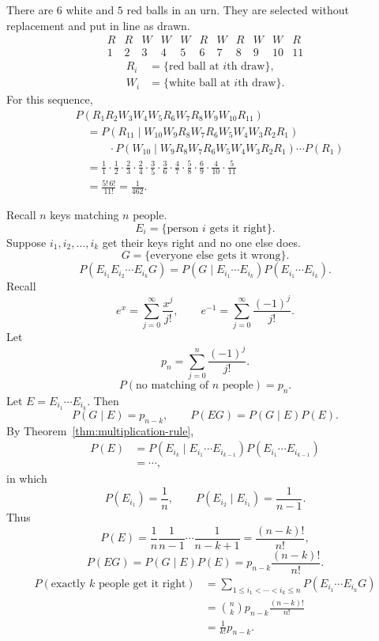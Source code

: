 \begin{example}
  There are $6$ white and $5$ red balls in an urn. They are selected without replacement and put in line as drawn.
  \[
    \begin{array}{ccccccccccc}
      R & R & W & W & W & R & W & R & W & W  & R  \\ \hline
      1 & 2 & 3 & 4 & 5 & 6 & 7 & 8 & 9 & 10 & 11
    \end{array}
  \]
  \begin{align*}
    R_i & =\{\text{red ball at }i\text{th draw}\},   \\
    W_i & =\{\text{white ball at }i\text{th draw}\}.
  \end{align*}
  For this sequence,
  \begin{align*}
     & P(R_1R_2W_3W_4W_5R_6W_7R_8W_9W_{10}R_{11})                                  \\
     & \quad=P(R_{11}\mid W_{10}W_9R_8W_7R_6W_5W_4W_3R_2R_1)                       \\
     & \qquad\quad\cdot P(W_{10}\mid W_9R_8W_7R_6W_5W_4W_3R_2R_1)\cdots P(R_1)     \\
     & \quad=\frac11\cdot\frac12\cdot\frac23\cdot\frac24\cdot\frac35
    \cdot\frac36\cdot\frac47\cdot\frac58\cdot\frac69\cdot\frac4{10}\cdot\frac5{11} \\
     & \quad=\frac{5!\,6!}{11!}=\frac1{462}.
  \end{align*}
\end{example}

\begin{example}
  Recall $n$ keys matching $n$ people.
  \[
    E_i=\{\text{person }i\text{ gets it right}\}.
  \]
  Suppose $i_1,i_2,\ldots,i_k$ get their keys right and no one else does.
  \[
    G=\{\text{everyone else gets it wrong}\}.
  \]
  \[
    P(E_{i_1}E_{i_2}\cdots E_{i_k}G)
    =P(G\mid E_{i_1}\cdots E_{i_k})P(E_{i_1}\cdots E_{i_k}).
  \]
  Recall
  \[
    e^x=\sum_{j=0}^{\infty}\frac{x^j}{j!},\qquad
    e^{-1}=\sum_{j=0}^{\infty}\frac{(-1)^j}{j!}.
  \]
  Let
  \[
    p_n=\sum_{j=0}^{n}\frac{(-1)^j}{j!}.
  \]
  \[
    P(\text{no matching of }n\text{ people})=p_n.
  \]
  Let $E=E_{i_1}\cdots E_{i_k}$. Then
  \[
    P(G\mid E)=p_{n-k},\qquad P(EG)=P(G\mid E)P(E).
  \]
  By Theorem~\ref{thm:multiplication-rule},
  \begin{align*}
    P(E) & =P(E_{i_k}\mid E_{i_1}\cdots E_{i_{k-1}})P(E_{i_1}\cdots E_{i_{k-1}}) \\
         & =\cdots,
  \end{align*}
  in which
  \[
    P(E_{i_1})=\frac1n,\qquad P(E_{i_2}\mid E_{i_1})=\frac1{n-1}.
  \]
  Thus
  \[
    P(E)=\frac1n\frac1{n-1}\cdots\frac1{n-k+1}=\frac{(n-k)!}{n!},
  \]
  \[
    P(EG)=P(G\mid E)P(E)=p_{n-k}\frac{(n-k)!}{n!}.
  \]
  \begin{align*}
    P(\text{exactly }k\text{ people get it right})
     & =\sum_{1\le i_1<\cdots<i_k\le n}P(E_{i_1}\cdots E_{i_k}G) \\
     & =\binom nk p_{n-k}\frac{(n-k)!}{n!}                       \\
     & =\frac1{k!}p_{n-k}.
  \end{align*}
\end{example}

